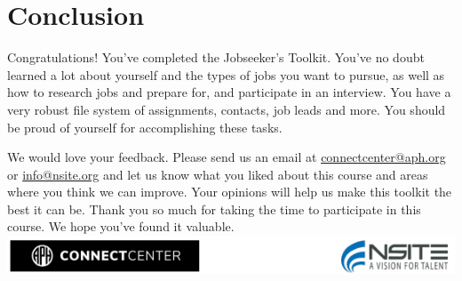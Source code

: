 \hypertarget{conclusion}{}\chapter*{Conclusion}\label{conclusion}

\noindent\makebox[\linewidth]{\rule{\linewidth}{0.4pt}}
\leftskip=0.5cm
Congratulations! You've completed the Jobseeker's Toolkit. You've no doubt learned a lot about yourself and the types of jobs you want to pursue, as well as how to research jobs and prepare for, and participate in an interview. You have a very robust file system of assignments, contacts, job leads and more. You should be proud of yourself for accomplishing these tasks.

We would love your feedback. Please send us an email at \href{mailto:connectcenter@aph.org}{connectcenter@aph.org} or \href{mailto:info@nsite.org}{info@nsite.org} and let us know what you liked about this course and areas where you think we can improve. Your opinions will help us make this toolkit the best it can be. Thank you so much for taking the time to participate in this course. We hope you've found it valuable.
\vfill
\includegraphics[width=1\linewidth]{branding.png}
